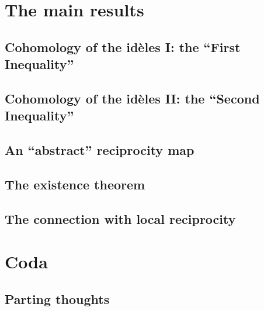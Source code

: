\documentclass{amsbook}
\begin{document}
\part{The main results}

\chapter{Cohomology of the id\`eles I: the ``First Inequality''}


\chapter{Cohomology of the id\`eles II: the ``Second Inequality''}


\chapter{An ``abstract'' reciprocity map}


\chapter{The existence theorem}


\chapter{The connection with local reciprocity}
\label{chap:connection}


\part{Coda}

\chapter{Parting thoughts}

\end{document}
